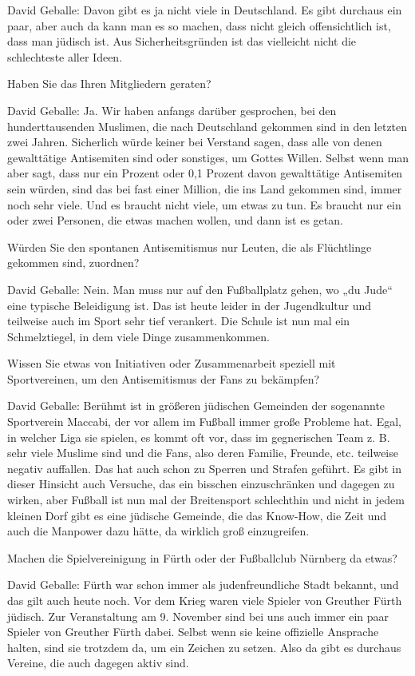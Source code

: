 David Geballe: Davon gibt es ja nicht viele in Deutschland. Es gibt durchaus ein paar, aber auch da kann man es so machen, dass nicht gleich offensichtlich ist, dass man jüdisch ist. Aus Sicherheitsgründen ist das vielleicht nicht die schlechteste aller Ideen. 

Haben Sie das Ihren Mitgliedern geraten? 

David Geballe: Ja. Wir haben anfangs darüber gesprochen, bei den hunderttausenden Muslimen, die nach Deutschland gekommen sind in den letzten zwei Jahren. Sicherlich würde keiner bei Verstand sagen, dass alle von denen gewalttätige Antisemiten sind oder sonstiges, um Gottes Willen. Selbst wenn man aber sagt, dass nur ein Prozent oder 0,1 Prozent davon gewalttätige Antisemiten sein würden, sind das bei fast einer Million, die ins Land gekommen sind, immer noch sehr viele. Und es braucht nicht viele, um etwas zu tun. Es braucht nur ein oder zwei Personen, die etwas machen wollen, und dann ist es getan. 

 Würden Sie den spontanen Antisemitismus nur Leuten, die als Flüchtlinge gekommen sind, zuordnen? 

David Geballe: Nein. Man muss nur auf den Fußballplatz gehen, wo „du Jude“ eine typische Beleidigung ist. Das ist heute leider in der Jugendkultur und teilweise auch im Sport sehr tief verankert. Die Schule ist nun mal ein Schmelztiegel, in dem viele Dinge zusammenkommen. 

Wissen Sie etwas von Initiativen oder Zusammenarbeit speziell mit Sportvereinen, um den Antisemitismus der Fans zu bekämpfen? 

David Geballe: Berühmt ist in größeren jüdischen Gemeinden der sogenannte Sportverein Maccabi, der vor allem im Fußball immer große Probleme hat. Egal, in welcher Liga sie spielen, es kommt oft vor, dass im gegnerischen Team z. B. sehr viele Muslime sind und die Fans, also deren Familie, Freunde, etc. teilweise negativ auffallen. Das hat auch schon zu Sperren und Strafen geführt. Es gibt in dieser Hinsicht auch Versuche, das ein bisschen einzuschränken und dagegen zu wirken, aber Fußball ist nun mal der Breitensport schlechthin und nicht in jedem kleinen Dorf gibt es eine jüdische Gemeinde, die das Know-How, die Zeit und auch die Manpower dazu hätte, da wirklich groß einzugreifen. 

Machen die Spielvereinigung in Fürth oder der Fußballclub Nürnberg da etwas? 

David Geballe: Fürth war schon immer als judenfreundliche Stadt bekannt, und das gilt auch heute noch. Vor dem Krieg waren viele Spieler von Greuther Fürth jüdisch. Zur Veranstaltung am 9. November sind bei uns auch immer ein paar Spieler von Greuther Fürth dabei. Selbst wenn sie keine offizielle Ansprache halten, sind sie trotzdem da, um ein Zeichen zu setzen. Also da gibt es durchaus Vereine, die auch dagegen aktiv sind. 

 

 